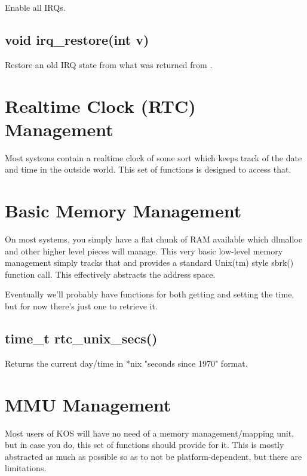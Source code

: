 \documentclass[english]{report}
\begin{document}
Enable all IRQs.


\subsection{void irq\_restore(int v)}

Restore an old IRQ state from what was returned from .


\section{Realtime Clock (RTC) Management}

Most systems contain a realtime clock of some sort which keeps track
of the date and time in the outside world. This set of functions is
designed to access that.


\section{Basic Memory Management}

On most systems, you simply have a flat chunk of RAM available which
dlmalloc and other higher level pieces will manage. This very basic
low-level memory management simply tracks that and provides a standard
Unix(tm) style sbrk() function call. This effectively abstracts the
address space.

Eventually we'll probably have functions for both getting and setting
the time, but for now there's just one to retrieve it.

\subsection{time\_t rtc\_unix\_secs()}

Returns the current day/time in *nix "seconds since 1970" format.


\section{MMU Management}

Most users of KOS will have no need of a memory management/mapping
unit, but in case you do, this set of functions should provide for
it. This is mostly abstracted as much as possible so as to not be
platform-dependent, but there are limitations.
\end{document}
